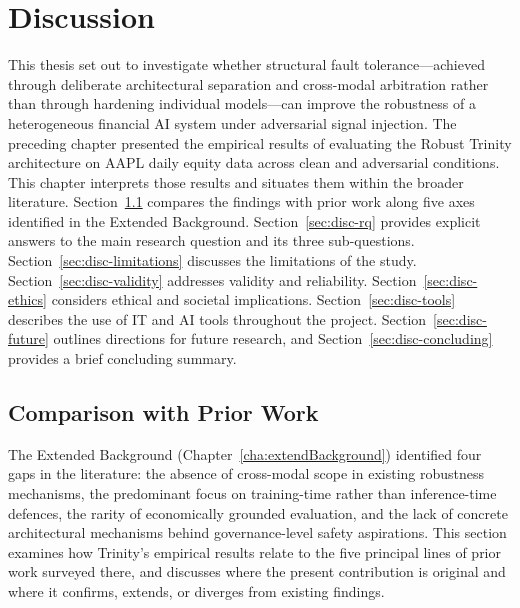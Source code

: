 \chapter{Discussion} \label{cha:discussion}

This thesis set out to investigate whether structural fault tolerance---achieved
through deliberate architectural separation and cross-modal arbitration rather
than through hardening individual models---can improve the robustness of a
heterogeneous financial AI system under adversarial signal injection. The
preceding chapter presented the empirical results of evaluating the Robust
Trinity architecture on AAPL daily equity data across clean and adversarial
conditions. This chapter interprets those results and situates them within the
broader literature. Section~\ref{sec:disc-prior-work} compares the findings
with prior work along five axes identified in the Extended Background.
Section~\ref{sec:disc-rq} provides explicit answers to the main research
question and its three sub-questions.
Section~\ref{sec:disc-limitations} discusses the limitations of the study.
Section~\ref{sec:disc-validity} addresses validity and reliability.
Section~\ref{sec:disc-ethics} considers ethical and societal implications.
Section~\ref{sec:disc-tools} describes the use of IT and AI tools throughout
the project. Section~\ref{sec:disc-future} outlines directions for future
research, and Section~\ref{sec:disc-concluding} provides a brief concluding
summary.

\section{Comparison with Prior Work}
\label{sec:disc-prior-work}

The Extended Background (Chapter~\ref{cha:extendBackground}) identified four
gaps in the literature: the absence of cross-modal scope in existing robustness
mechanisms, the predominant focus on training-time rather than inference-time
defences, the rarity of economically grounded evaluation, and the lack of
concrete architectural mechanisms behind governance-level safety aspirations.
This section examines how Trinity's empirical results relate to the five
principal lines of prior work surveyed there, and discusses where the present
contribution is original and where it confirms, extends, or diverges from
existing findings.

